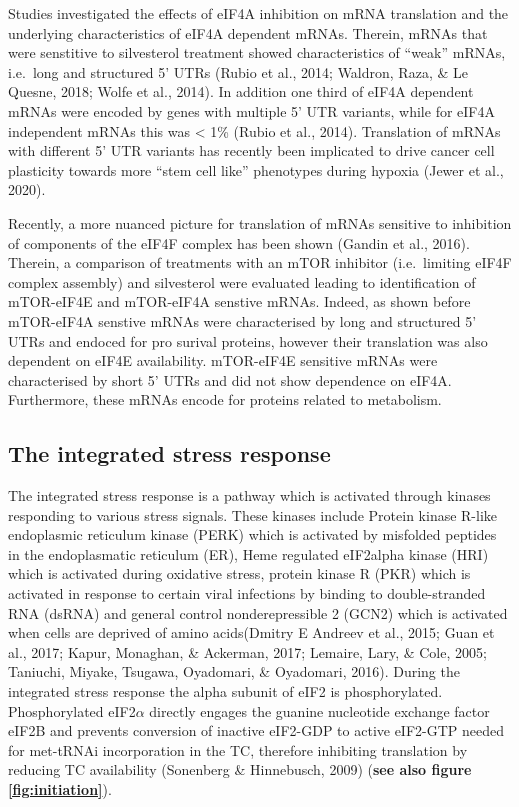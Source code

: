 \documentclass[12pt,openany]{book}
\begin{document}
Studies investigated the effects of eIF4A inhibition on mRNA translation
and the underlying characteristics of eIF4A dependent mRNAs. Therein,
mRNAs that were senstitive to silvesterol treatment showed
characteristics of ``weak'' mRNAs, i.e.~long and structured 5' UTRs
(Rubio et al., 2014; Waldron, Raza, \& Le Quesne, 2018; Wolfe et al.,
2014). In addition one third of eIF4A dependent mRNAs were encoded by
genes with multiple 5' UTR variants, while for eIF4A independent mRNAs
this was \textless{} 1\% (Rubio et al., 2014). Translation of mRNAs with
different 5' UTR variants has recently been implicated to drive cancer
cell plasticity towards more ``stem cell like'' phenotypes during
hypoxia (Jewer et al., 2020).

Recently, a more nuanced picture for translation of mRNAs sensitive to
inhibition of components of the eIF4F complex has been shown (Gandin et
al., 2016). Therein, a comparison of treatments with an mTOR inhibitor
(i.e.~limiting eIF4F complex assembly) and silvesterol were evaluated
leading to identification of mTOR-eIF4E and mTOR-eIF4A senstive mRNAs.
Indeed, as shown before mTOR-eIF4A senstive mRNAs were characterised by
long and structured 5' UTRs and endoced for pro surival proteins,
however their translation was also dependent on eIF4E availability.
mTOR-eIF4E sensitive mRNAs were characterised by short 5' UTRs and did
not show dependence on eIF4A. Furthermore, these mRNAs encode for
proteins related to metabolism.

\subsection{The integrated stress response}

The integrated stress response is a pathway which is activated through
kinases responding to various stress signals. These kinases include
Protein kinase R-like endoplasmic reticulum kinase (PERK) which is
activated by misfolded peptides in the endoplasmatic reticulum (ER),
Heme regulated eIF2alpha kinase (HRI) which is activated during
oxidative stress, protein kinase R (PKR) which is activated in response
to certain viral infections by binding to double-stranded RNA (dsRNA)
and general control nonderepressible 2 (GCN2) which is activated when
cells are deprived of amino acids(Dmitry E Andreev et al., 2015; Guan et
al., 2017; Kapur, Monaghan, \& Ackerman, 2017; Lemaire, Lary, \& Cole,
2005; Taniuchi, Miyake, Tsugawa, Oyadomari, \& Oyadomari, 2016). During
the integrated stress response the alpha subunit of eIF2 is
phosphorylated. Phosphorylated eIF2\(\alpha\) directly engages the
guanine nucleotide exchange factor eIF2B and prevents conversion of
inactive eIF2-GDP to active eIF2-GTP needed for met-tRNAi incorporation
in the TC, therefore inhibiting translation by reducing TC availability
(Sonenberg \& Hinnebusch, 2009) (\textbf{see also figure
\ref{fig:initiation}}).
\end{document}

